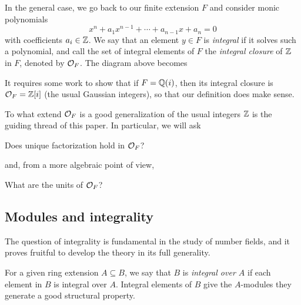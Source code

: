 In the general case, we go back to our finite extension $F$ and consider monic polynomials
\[
	x^n + a_1x^{n-1} + \cdots + a_{n-1}x + a_n = 0
\]
with coefficients $a_i\in\mathbb{Z}$. We say that an element $y\in F$ is \emph{integral} if it solves such a polynomial, and call the set of integral elements of $F$ the \emph{integral closure} of $\mathbb{Z}$ in $F$, denoted by $\mathcal{O}_F$. The diagram above becomes

\begin{center}
\end{center}

It requires some work to show that if $F=\mathbb{Q}(i)$, then its integral closure is $\mathcal{O}_F=\mathbb{Z}[i]$ (the usual Gaussian integers), so that our definition does make sense.

To what extend $\mathcal{O}_F$ is a good generalization of the usual integers $\mathbb{Z}$ is the guiding thread of this paper. In particular, we will ask

\begin{quest}
	Does unique factorization hold in $\mathcal{O}_F$?
\end{quest}

and, from a more algebraic point of view,

\begin{quest}
	What are the units of $\mathcal{O}_F$?
\end{quest}


\subsection{Modules and integrality}

The question of integrality is fundamental in the study of number fields, and it proves fruitful to develop the theory in its full generality.

For a given ring extension $A\subseteq B$, we say that $B$ is \emph{integral over $A$} if each element in $B$ is integral over $A$. Integral elements of $B$ give the $A$-modules they generate a good structural property.

